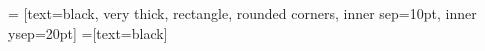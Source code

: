 


 = [text=black, very thick,
    rectangle, rounded corners, inner sep=10pt, inner ysep=20pt]
 =[text=black]

\newcommand{\yslant}{0.5}
\newcommand{\xslant}{-0.6}

\newcommand\overmat[3]{%
  \makebox[0pt][l]{$\smash{\color{#3}\overbrace{\phantom{%
    \begin{matrix}#2\end{matrix}}}^{\text{#1}}}$}#2}
\newcommand\undermat[3]{%
  \makebox[0pt][l]{$\smash{\color{#3}\underbrace{\phantom{%
    \begin{matrix}#2\end{matrix}}}_{\text{#1}}}$}#2}
\newcommand\partialphantom{\vphantom{\frac{\partial e_{P,M}}{\partial w_{1,1}}}}

